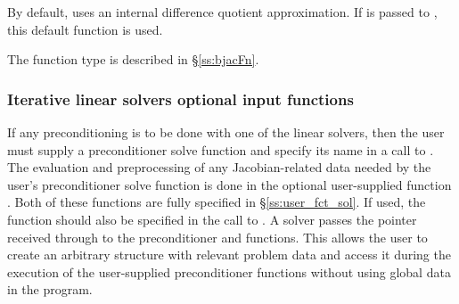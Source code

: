 {
  By default, {\kinband} uses an internal difference quotient approximation.
  If  is passed to , this default function is used.

  The function type  is described in \S\ref{ss:bjacFn}.
}

\subsubsection{Iterative linear solvers optional input functions}\label{sss:optin_spils}
If any preconditioning is to be done with one of the {\kinspils} linear
solvers, then the user must supply a preconditioner solve function 
and specify its name in a call to .
The evaluation and preprocessing of any Jacobian-related data needed
by the user's preconditioner solve function is done in the optional
user-supplied function . Both of these functions are
fully specified in \S\ref{ss:user_fct_sol}.
If used, the  function should also be specified in the call to
.
A {\kinspils} solver passes the pointer 
received through  to the preconditioner
 and  functions.  This allows the user to create
an arbitrary structure with relevant problem data and access it during
the execution of the user-supplied preconditioner functions without using
global data in the program.

